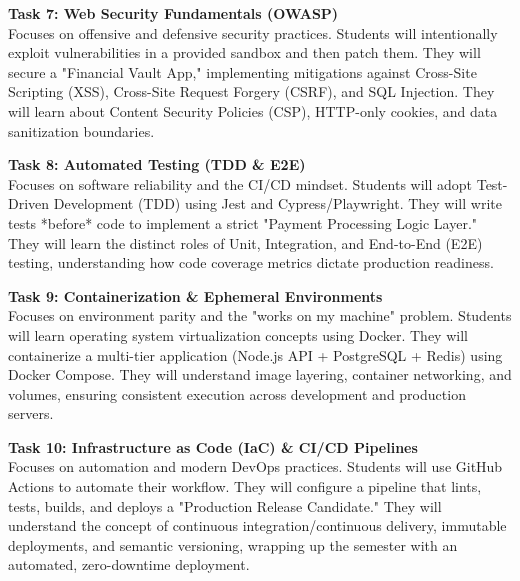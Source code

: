 \vspace{0.3cm}

\noindent\textbf{Task 7: Web Security Fundamentals (OWASP)} \\
Focuses on offensive and defensive security practices. Students will intentionally exploit vulnerabilities in a provided sandbox and then patch them. They will secure a "Financial Vault App," implementing mitigations against Cross-Site Scripting (XSS), Cross-Site Request Forgery (CSRF), and SQL Injection. They will learn about Content Security Policies (CSP), HTTP-only cookies, and data sanitization boundaries.

\vspace{0.3cm}

\noindent\textbf{Task 8: Automated Testing (TDD \& E2E)} \\
Focuses on software reliability and the CI/CD mindset. Students will adopt Test-Driven Development (TDD) using Jest and Cypress/Playwright. They will write tests *before* code to implement a strict "Payment Processing Logic Layer." They will learn the distinct roles of Unit, Integration, and End-to-End (E2E) testing, understanding how code coverage metrics dictate production readiness.

\vspace{0.3cm}

\noindent\textbf{Task 9: Containerization \& Ephemeral Environments} \\
Focuses on environment parity and the "works on my machine" problem. Students will learn operating system virtualization concepts using Docker. They will containerize a multi-tier application (Node.js API + PostgreSQL + Redis) using Docker Compose. They will understand image layering, container networking, and volumes, ensuring consistent execution across development and production servers.

\vspace{0.3cm}

\noindent\textbf{Task 10: Infrastructure as Code (IaC) \& CI/CD Pipelines} \\
Focuses on automation and modern DevOps practices. Students will use GitHub Actions to automate their workflow. They will configure a pipeline that lints, tests, builds, and deploys a "Production Release Candidate." They will understand the concept of continuous integration/continuous delivery, immutable deployments, and semantic versioning, wrapping up the semester with an automated, zero-downtime deployment.

\newpage

